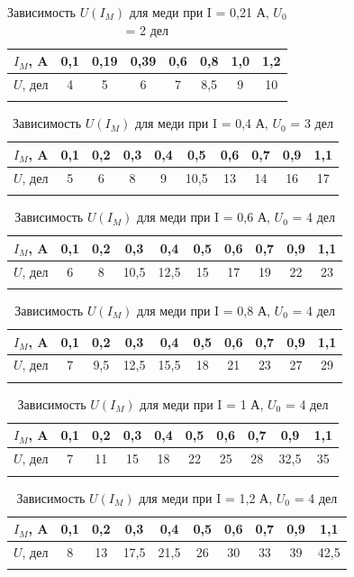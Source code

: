 \documentclass[a4paper, 12pt]{article}%
\begin{document}
\begin{enumerate}
	\begin{longtable} {|c|c|c|c|c|c|c|c|}
		\hline
		$I_M$, A & 0,1 & 0,19 & 0,39 & 0,6 & 0,8 & 1,0 & 1,2  \\ \hline
		$U$, дел & 4 & 5 & 6 & 7 & 8,5 & 9 & 10 \\ \hline
		\caption{Зависимость $U(I_M)$ для меди при I = 0,21 А, $U_0$ = 2 дел}
	\end{longtable}
	
		
	\begin{longtable} {|c|c|c|c|c|c|c|c|c|c|}
		\hline
		$I_M$, A & 0,1 & 0,2 & 0,3 & 0,4 & 0,5 & 0,6 & 0,7 & 0,9 & 1,1  \\ \hline
		$U$, дел & 5 & 6 & 8 & 9 & 10,5 & 13 & 14 & 16 & 17 \\ \hline
		\caption{Зависимость $U(I_M)$ для меди при I = 0,4 А, $U_0$ = 3 дел}
	\end{longtable}

	\begin{longtable} {|c|c|c|c|c|c|c|c|c|c|}
		\hline
		$I_M$, A & 0,1 & 0,2 & 0,3 & 0,4 & 0,5 & 0,6 & 0,7 & 0,9 & 1,1  \\ \hline
		$U$, дел & 6 & 8 & 10,5 & 12,5 & 15 & 17 & 19 & 22 & 23 \\ \hline
		\caption{Зависимость $U(I_M)$ для меди при I = 0,6 А, $U_0$ = 4 дел}
	\end{longtable}
		
	\begin{longtable} {|c|c|c|c|c|c|c|c|c|c|}
		\hline
		$I_M$, A & 0,1 & 0,2 & 0,3 & 0,4 & 0,5 & 0,6 & 0,7 & 0,9 & 1,1  \\ \hline
		$U$, дел & 7 & 9,5 & 12,5 & 15,5 & 18 & 21 & 23 & 27 & 29 \\ \hline
		\caption{Зависимость $U(I_M)$ для меди при I = 0,8 А, $U_0$ = 4 дел}
	\end{longtable}
		
	\begin{longtable} {|c|c|c|c|c|c|c|c|c|c|}
		\hline
		$I_M$, A & 0,1 & 0,2 & 0,3 & 0,4 & 0,5 & 0,6 & 0,7 & 0,9 & 1,1  \\ \hline
		$U$, дел & 7 & 11 & 15 & 18 & 22 & 25 & 28 & 32,5 & 35 \\ \hline
		\caption{Зависимость $U(I_M)$ для меди при I = 1 А, $U_0$ = 4 дел}
	\end{longtable}
		
	
	\begin{longtable} {|c|c|c|c|c|c|c|c|c|c|}
		\hline
		$I_M$, A & 0,1 & 0,2 & 0,3 & 0,4 & 0,5 & 0,6 & 0,7 & 0,9 & 1,1  \\ \hline
		$U$, дел & 8 & 13 & 17,5 & 21,5 & 26 & 30 & 33 & 39 & 42,5 \\ \hline
		\caption{Зависимость $U(I_M)$ для меди при I = 1,2 А, $U_0$ = 4 дел}
	\end{longtable}
		

\end{enumerate}
\end{document}
